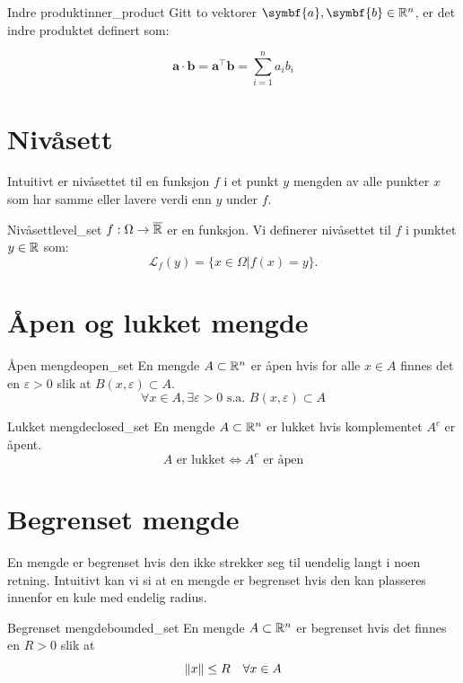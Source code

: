 \begin{definition}{Indre produkt}{inner_product}
  Gitt to vektorer \( \symbf{a}, \symbf{b} \in \R^n \), er det indre produktet definert som:

  \[
    \symbf{a} \cdot \symbf{b} = \symbf{a}^\top \symbf{b} = \sum_{i=1}^{n} a_i b_i
  \]

\end{definition}



\section{Nivåsett}
Intuitivt er nivåsettet til en funksjon \( f \) i et punkt \( y \) mengden av alle punkter \( x \) som har samme eller lavere verdi enn \( y \) under \( f \).
\begin{definition}{Nivåsett}{level_set}
  \(f: \Omega \to \overline{\mathbb{R}}\) er en funksjon. Vi definerer nivåsettet til \(f\) i punktet \(y \in \mathbb{R}\) som:
  \[
    \mathcal{L}_f(y) = \{x \in \Omega | f(x) = y\}.
  \]
\end{definition}

\section{Åpen og lukket mengde}

\begin{definition}{Åpen mengde}{open_set}
  En mengde \(A \subset \mathbb{R}^n\) er åpen hvis for alle \(x \in A\) finnes det en \(\varepsilon > 0\) slik at \(B(x, \varepsilon) \subset A\).
  \[
    \forall x \in A, \exists \varepsilon > 0 \text{ s.a. } B(x, \varepsilon) \subset A
  \]
\end{definition}

\begin{definition}{Lukket mengde}{closed_set}
  En mengde \(A \subset \mathbb{R}^n\) er lukket hvis komplementet \(A^c\) er åpent.
  \[
    A \text{ er lukket} \Leftrightarrow A^c \text{ er åpen}
  \]
\end{definition}

\section{Begrenset mengde}
En mengde er begrenset hvis den ikke strekker seg til uendelig langt i noen retning.
Intuitivt kan vi si at en mengde er begrenset hvis den kan plasseres innenfor en kule med endelig radius.

\begin{definition}{Begrenset mengde}{bounded_set}
  En mengde \(A \subset \mathbb{R}^n\) er begrenset hvis det finnes en \(R > 0\) slik at
  \[
    \lVert x\rVert \leq R \quad \forall x \in A
  \]
\end{definition}

